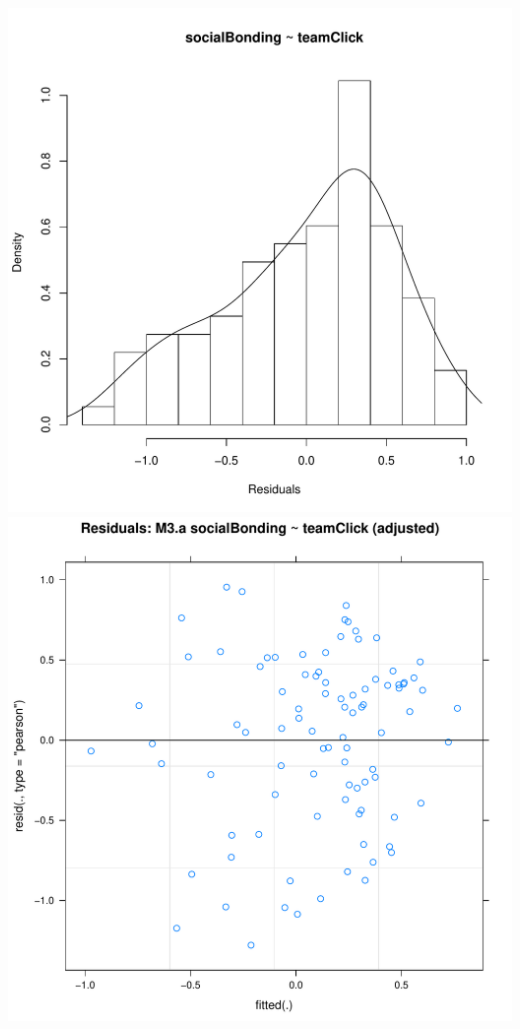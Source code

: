 \documentclass[12pt]{report}
\begin{document}
\centering
\newpage
\includegraphics[scale =.4]{../images/MLM3aOutHist.pdf}
\includegraphics[scale =.4]{../images/MLM3aOutScatter.pdf}
\end{document}
